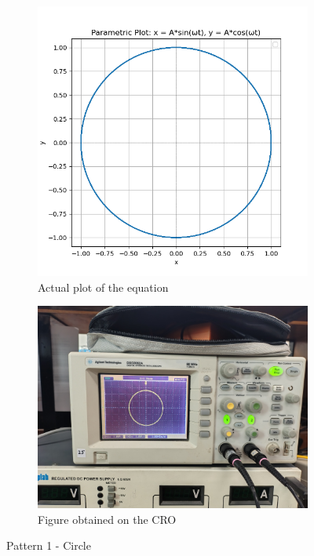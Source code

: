 \documentclass[12pt]{article}
\begin{document}
\begin{figure}[htbp]
    \centering
    \begin{subfigure}[b]{0.45\textwidth}
        \centering
        \includegraphics[width=\textwidth]{figs/Experiment-1/Observation-1/Figure_1.jpg}
        \caption{Actual plot of the equation}
    \end{subfigure}
    \hfill
    \begin{subfigure}[b]{0.45\textwidth}
        \centering
        \includegraphics[width=\textwidth]{figs/Experiment-1/Observation-1/Figure_2.jpg}
        \caption{Figure obtained on the CRO}
    \end{subfigure}
    \caption{Pattern 1 - Circle}
\end{figure}
\end{document}
